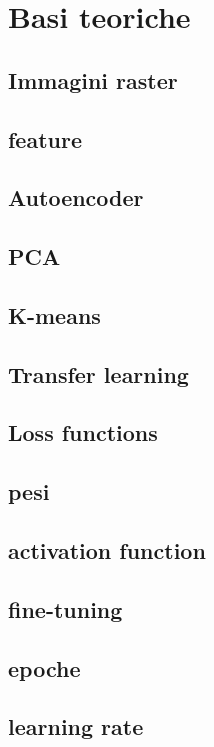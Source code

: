 \chapter{Basi teoriche}
\label{cap:teoria}

\section{Immagini raster}

\section{feature}

\section{Autoencoder}

\section{PCA}

\section{K-means}

\section{Transfer learning}

\section{Loss functions}

\section{pesi}

\section{activation function}

\section{fine-tuning}

\section{epoche}

\section{learning rate}